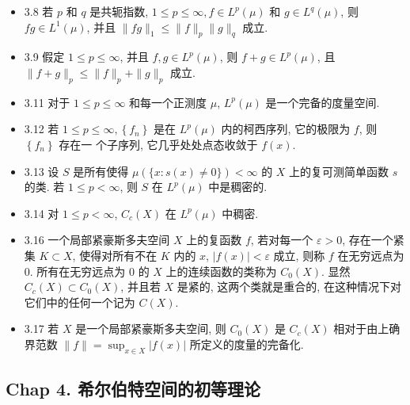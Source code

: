 \begin{itemize}
\item 3.8 若 $p$ 和 $q$ 是共轭指数, $1 \leqslant p \leqslant \infty, f \in L^{p}(\mu)$ 和 $g \in L^{q}(\mu)$, 则 $f g \in L^{1}(\mu)$, 并且 $\|f g\|_{1} \leqslant\|f\|_{p}\|g\|_{q}$ 成立.

\item 3.9 假定 $1 \leqslant p \leqslant \infty$, 并且 $f, g \in L^{p}(\mu)$, 则 $f+g \in L^{p}(\mu)$, 且 $\|f+g\|_{p} \leqslant\|f\|_{p}+\|g\|_{p}$ 成立.

\item 3.11 对于 $1 \leqslant p \leqslant \infty$ 和每一个正测度 $\mu$, $L^{p}(\mu)$ 是一个完备的度量空间.

\item 3.12 若 $1 \leqslant p \leqslant \infty,\left\{f_{n}\right\}$ 是在 $L^{p}(\mu)$ 内的柯西序列, 它的极限为 $f$, 则 $\left\{f_{n}\right\}$ 存在一 个子序列, 它几乎处处点态收敛于 $f(x)$.

\item 3.13 设 $S$ 是所有使得 $\mu(\{x: s(x) \neq 0\})<\infty$ 的 $X$ 上的复可测简单函数 $s$ 的类. 若 $1 \leqslant p<\infty$, 则 $S$ 在 $L^{p}(\mu)$ 中是稠密的.

\item 3.14 对 $1 \leqslant p<\infty$, $C_{c}(X)$ 在 $L^{p}(\mu)$ 中稠密.

\item 3.16 一个局部紧豪斯多夫空间 $X$ 上的复函数 $f$, 若对每一个 $\varepsilon>0$, 存在一个紧集 $K \subset X$, 使得对所有不在 $K$ 内的 $x$, $|f(x)|<\varepsilon$ 成立, 则称 $f$ 在无穷远点为 0. 所有在无穷远点为 0 的 $X$ 上的连续函数的类称为 $C_{0}(X)$. 显然 $C_{c}(X) \subset C_{0}(X)$, 并且若 $X$ 是紧的, 这两个类就是重合的, 在这种情况下对它们中的任何一个记为 $C(X)$.

\item 3.17 若 $X$ 是一个局部紧豪斯多夫空间, 则 $C_{0}(X)$ 是 $C_{c}(X)$ 相对于由上确界范数 $\|f\|=\sup _{x \in X}|f(x)|$ 所定义的度量的完备化.
\end{itemize}

\subsection{Chap 4. 希尔伯特空间的初等理论}

